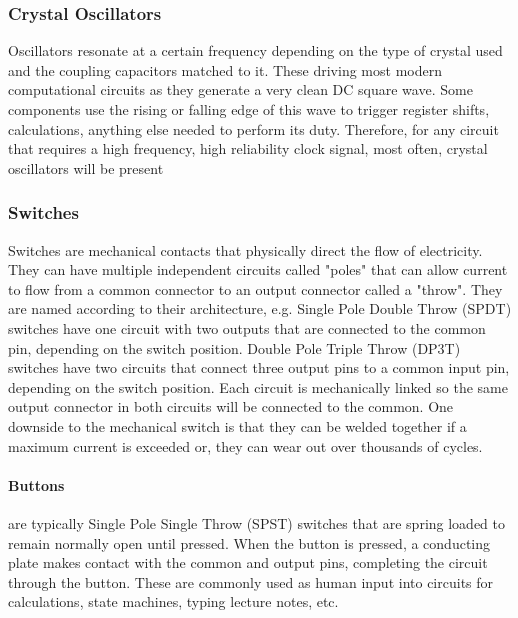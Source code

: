         \subsubsection*{Crystal Oscillators}
        Oscillators resonate at a certain frequency depending on the type of crystal used and the coupling capacitors matched to it.
        These driving most modern computational circuits as they generate a very clean DC square wave. 
        Some components use the rising or falling edge of this wave to trigger register shifts, calculations, anything else needed to perform its duty.
        Therefore, for any circuit that requires a high frequency, high reliability clock signal, most often, crystal oscillators will be present


        \subsubsection*{Switches}
        Switches are mechanical contacts that physically direct the flow of electricity.
        They can have multiple independent circuits called "poles" that can allow current to flow from a common connector to an output connector called a "throw".
        They are named according to their architecture, e.g. Single Pole Double Throw (SPDT) switches have one circuit with two outputs that are connected to the common pin, depending on the switch position.
        Double Pole Triple Throw (DP3T) switches have two circuits that connect three output pins to a common input pin, depending on the switch position.
        Each circuit is mechanically linked so the same output connector in both circuits will be connected to the common.
        One downside to the mechanical switch is that they can be welded together if a maximum current is exceeded or, they can wear out over thousands of cycles.


        \paragraph*{Buttons} are typically Single Pole Single Throw (SPST) switches that are spring loaded to remain normally open until pressed.
        When the button is pressed, a conducting plate makes contact with the common and output pins, completing the circuit through the button.
        These are commonly used as human input into circuits for calculations, state machines, typing lecture notes, etc.

